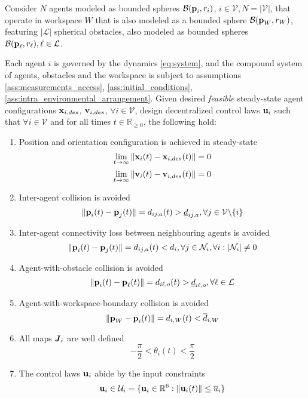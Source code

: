 \begin{bg_box}
\begin{problem}
  Consider $N$ agents modeled as bounded spheres $\mathcal{B}(\bm{\mathbf{p}}_i, r_i)$,
  $i \in \mathcal{V}, N = |\mathcal{V}|$, that operate in workspace $W$ that is
  also modeled as a bounded sphere $\mathcal{B}(\bm{\mathbf{p}}_W,r_W)$,
  featuring $|\mathcal{L}|$ spherical obstacles, also modeled as bounded
  spheres $\mathcal{B}(\bm{\mathbf{p}}_{\ell}, r_{\ell}), \ell \in \mathcal{L}$.

  Each agent $i$ is governed by the dynamics \eqref{eq:system}, and the compound
  system of agents, obstacles and the workspace is subject to assumptions
  \eqref{ass:measurements_access}, \eqref{ass:initial_conditions},
  \eqref{ass:intra_environmental_arrangement}. Given desired \textit{feasible}
  steady-state agent configurations $\bm{\mathbf{x}}_{i,des}$, $\bm{\mathbf{v}}_{i,des}$,
  $\forall i \in \mathcal{V}$, design decentralized control laws
  $\bm{\mathbf{u}}_i$ such that $\forall i \in \mathcal{V}$ and for all times $t \in \mathbb{R}_{\geq 0}$,
  the following hold:

  \begin{enumerate}

    \item Position and orientation configuration is achieved in steady-state
      $$\lim_{t \to \infty} \|\bm{\mathbf{x}}_i(t) - \bm{\mathbf{x}}_{i,des}(t)\| = 0$$
      $$\lim_{t \to \infty} \|\bm{\mathbf{v}}_i(t) - \bm{\mathbf{v}}_{i,des}(t)\| = 0$$

    \item Inter-agent collision is avoided
      $$\|\bm{\mathbf{p}}_i(t) - \bm{\mathbf{p}}_j(t)\| = d_{ij,a}(t) > \underline{d}_{ij,a},
      \forall j \in \mathcal{V} \backslash \{i\}$$

    \item Inter-agent connectivity loss between neighbouring agents is avoided
      $$ \|\bm{\mathbf{p}}_i(t) - \bm{\mathbf{p}}_j(t)\| = d_{ij,a} (t) < d_i,
      \forall j \in \mathcal{N}_i, \forall i : |\mathcal{N}_i| \not= 0$$

    \item Agent-with-obstacle collision is avoided
      $$ \|\bm{\mathbf{p}}_i(t) - \bm{\mathbf{p}}_{\ell}(t)\| = d_{i\ell,o} (t) > \underline{d}_{i\ell,o},
      \forall \ell \in \mathcal{L}$$

    \item Agent-with-workspace-boundary collision is avoided
      $$ \|\bm{\mathbf{p}}_W - \bm{\mathbf{p}}_i(t)\| = d_{i,W} (t) < \overline{d}_{i,W}$$

    \item All maps $\bm{\mathit{J}}_i$ are well defined
      $$- \frac{\pi}{2} < \theta_i(t) < \frac{\pi}{2}$$

    \item The control laws $\bm{\mathbf{u}}_i$ abide by the input constraints
      $$\bm{\mathbf{u}}_i \in \mathcal{U}_i = \{ \bm{\mathbf{u}}_i \in \mathbb{R}^6 :
        \|\bm{\mathbf{u}}_i (t)\| \leq \overline{u}_i\} $$

  \end{enumerate}
\label{problem}
\end{problem}
\end{bg_box}
